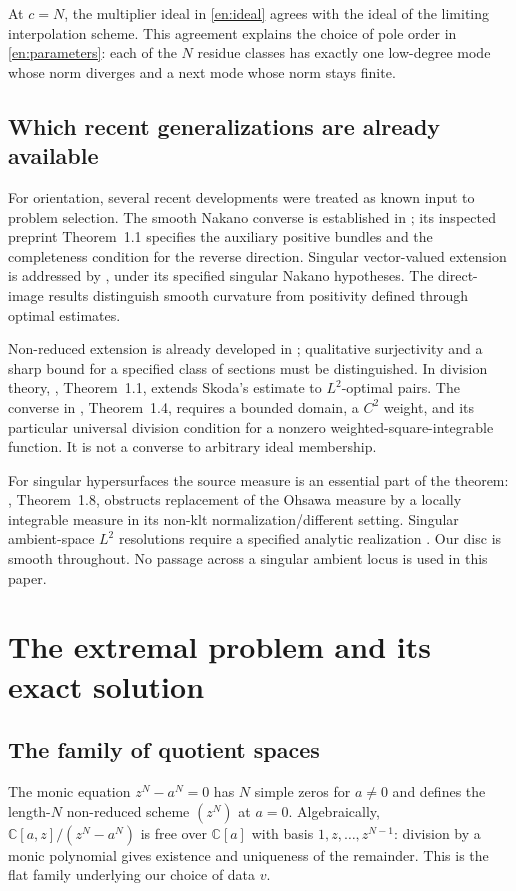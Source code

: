 \documentclass[12pt]{amsart}
\theoremstyle{definition}
\theoremstyle{remark}
\numberwithin{equation}{section}
\newcommand{\C}{\mathbb{C}}
\theoremstyle{definition}
\begin{document}
At $c=N$, the multiplier ideal in \eqref{en:ideal} agrees with the ideal
of the limiting interpolation scheme. This agreement explains the
choice of pole order in \eqref{en:parameters}: each of the $N$ residue
classes has exactly one low-degree mode whose norm diverges and a next
mode whose norm stays finite.

\subsection{Which recent generalizations are already available}
For orientation, several recent developments were treated as known
input to problem selection. The smooth Nakano converse is established
in \cite{DNWZ23}; its inspected preprint Theorem~1.1 specifies the
auxiliary positive bundles and the completeness condition for the
reverse direction. Singular vector-valued extension is addressed by
\cite{GMY26}, under its specified singular Nakano hypotheses. The
direct-image results \cite{Ber09,IMW24} distinguish smooth curvature
from positivity defined through optimal estimates.

Non-reduced extension is already developed in
\cite{Dem17,CDM17,ZZ19,LXZ23}; qualitative surjectivity and a sharp
bound for a specified class of sections must be distinguished.
In division theory, \cite{LZ26}, Theorem~1.1, extends Skoda's estimate \cite{Sk72}
to $L^2$-optimal pairs. The converse in \cite{LMNZ25}, Theorem~1.4,
requires a bounded domain, a $C^2$ weight, and its particular universal
division condition for a nonzero weighted-square-integrable function.
It is not a converse to arbitrary ideal membership.

For singular hypersurfaces the source measure is an essential part of
the theorem: \cite{KS23}, Theorem~1.8, obstructs replacement of the
Ohsawa measure by a locally integrable measure in its non-klt
normalization/different setting. Singular ambient-space $L^2$
resolutions require a specified analytic realization \cite{Wat26}.
Our disc is smooth throughout. No passage across a singular ambient
locus is used in this paper.

\section{The extremal problem and its exact solution}
\subsection{The family of quotient spaces}
The monic equation $z^N-a^N=0$ has $N$ simple zeros for $a\ne0$ and
defines the length-$N$ non-reduced scheme $(z^N)$ at $a=0$.
Algebraically, $\C[a,z]/(z^N-a^N)$ is free over $\C[a]$ with basis
$1,z,\ldots,z^{N-1}$: division by a monic polynomial gives existence
and uniqueness of the remainder. This is the flat family underlying
our choice of data $v$.
\end{document}

